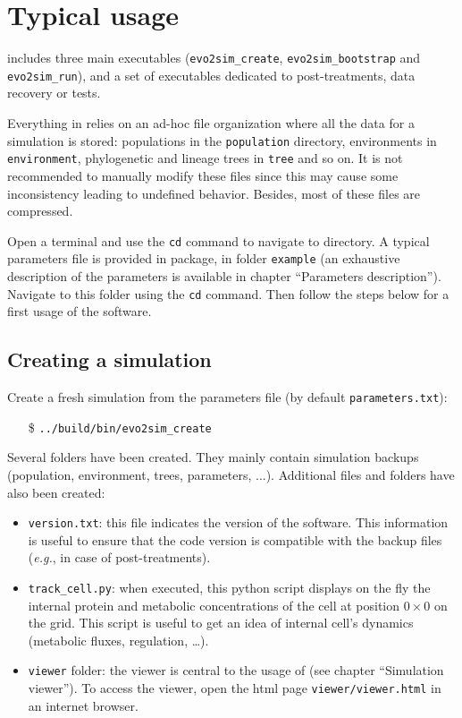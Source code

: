 \chapter{Typical usage}

{\packageName} includes three main executables (\texttt{evo2sim\_create}, \texttt{evo2sim\_bootstrap} and \texttt{evo2sim\_run}), and a set of executables dedicated to post-treatments, data recovery or tests.

Everything in {\packageName} relies on an ad-hoc file organization where all the data for a simulation is stored: populations in the \texttt{population} directory, environments in \texttt{environment}, phylogenetic and lineage trees in \texttt{tree} and so on. It is not recommended to manually modify these files since this may cause some inconsistency leading to undefined behavior. Besides, most of these files are compressed.

Open a terminal and use the \texttt{cd} command to navigate to {\packageName} directory.
A typical parameters file is provided in {\packageName} package, in folder \texttt{example} (an exhaustive description of the parameters is available in chapter ``Parameters description''). Navigate to this folder using the \texttt{cd} command.
Then follow the steps below for a first usage of the software.

\section{Creating a simulation}

Create a fresh simulation from the parameters file (by default \texttt{parameters.txt}):
\begin{itemize}
        \item[\$] \texttt{../build/bin/evo2sim\_create}
\end{itemize}
Several folders have been created. They mainly contain simulation backups (population, environment, trees, parameters, ...). Additional files and folders have also been created:
\begin{itemize}
        \item \texttt{version.txt}: this file indicates the version of the software. This information is useful to ensure that the code version is compatible with the backup files (\textit{e.g.}, in case of post-treatments).
        \item \texttt{track\_cell.py}: when executed, this python script displays on the fly the internal protein and metabolic concentrations of the cell at position $0\times0$ on the grid. This script is useful to get an idea of internal cell's dynamics (metabolic fluxes, regulation, \ldots).
        \item \texttt{viewer} folder: the viewer is central to the usage of {\packageName} (see chapter ``Simulation viewer''). To access the viewer, open the html page \texttt{viewer/viewer.html} in an internet browser.
\end{itemize}

